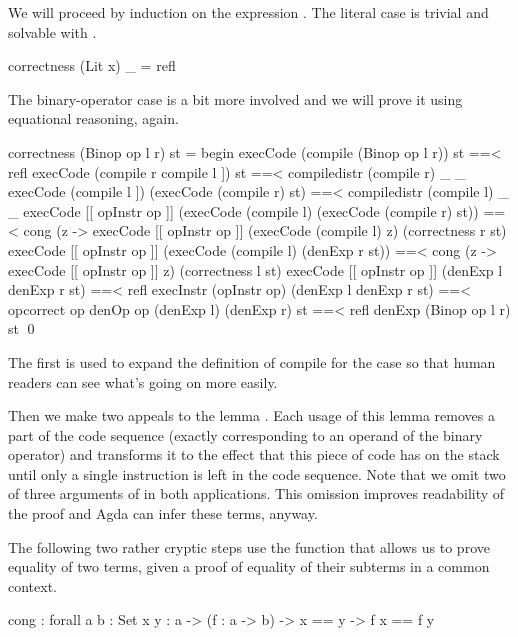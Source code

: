 \noindent We will proceed by induction on the expression . The literal
case is trivial and solvable with .

\begin{code}
  correctness (Lit x) _ = refl
\end{code}

\noindent The binary-operator case is a bit more involved and we will prove it
using equational reasoning, again.

\begin{code}
  correctness (Binop op l r) st = begin
    execCode (compile (Binop op l r)) st
      ==< refl \>
    execCode (compile r \app compile l \app [[ opInstr op ]]) st
      ==< compile\-distr (compile r) _ _ \>
    execCode (compile l \app [[ opInstr op ]]) (execCode (compile r) st)
      ==< compile\-distr (compile l) _ _ \>
    execCode [[ opInstr op ]] (execCode (compile l) (execCode (compile r) st))
      ==< cong (\lam z -> execCode [[ opInstr op ]] (execCode (compile l) z) (correctness r st) \>
    execCode [[ opInstr op ]] (execCode (compile l) (denExp r \scons st))
      ==< cong (\lam z -> execCode [[ opInstr op ]] z) (correctness l st) \>
    execCode [[ opInstr op ]] (denExp l \scons denExp r \scons st)
      ==< refl \>
    execInstr (opInstr op) (denExp l \scons denExp r \scons st)
      ==< op\-correct op \>
    denOp op (denExp l) (denExp r) \scons st
      ==< refl \>
    denExp (Binop op l r) \scons st
    \qed
\end{code}

\noindent The first  is used to expand the definition of compile
for the  case so that human readers can see what's going on more
easily.

Then we make two appeals to the lemma . Each usage of this
lemma removes a part of the code sequence (exactly corresponding to an operand
of the binary operator) and transforms it to the effect that this piece of code
has on the stack until only a single instruction is left in the code sequence.
Note that we omit two of three arguments of  in both
applications. This omission improves readability of the proof and Agda can
infer these terms, anyway.

The following two rather cryptic steps use the function  that allows
us to prove equality of two terms, given a proof of equality of their subterms
in a common context.

\begin{code}
  cong : forall {a b : Set} {x y : a}
    -> (f : a -> b)
    -> x == y -> f x == f y
\end{code}

